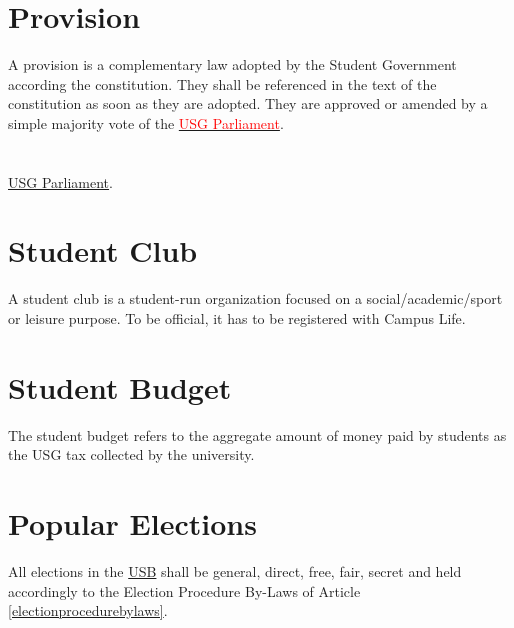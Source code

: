 \section{Provision}
A provision is a complementary law adopted by the Student Government according the constitution. They shall be referenced in the text of the constitution as soon as they are adopted. They are approved or amended by a simple majority vote of the \hyperref[USGParliamentDef]{\textcolor{red}{USG Parliament}}.

\section{}
 \hyperref[USGParliamentDef]{USG Parliament}.

\section{Student Club}
A student club is a student-run organization focused on a social/academic/sport or leisure purpose. To be official, it has to be registered with Campus Life.

\section{Student Budget}
The student budget refers to the aggregate amount of money paid by students as the USG tax collected by the university.

\section{Popular Elections}
All elections in the \hyperref[studentbody]{USB} shall be general, direct, free, fair, secret and held accordingly to the Election Procedure By-Laws of Article \ref{electionprocedurebylaws}.

